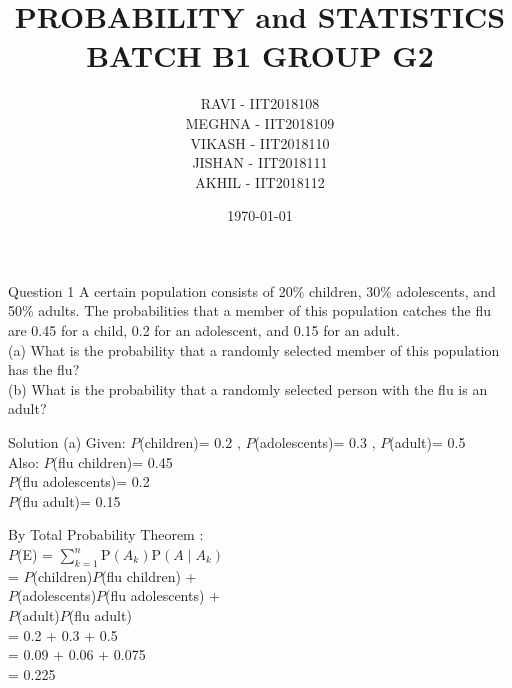 \documentclass{beamer}
\title{PROBABILITY and STATISTICS \\ BATCH B1 GROUP G2}
\author{RAVI - IIT2018108 \\ MEGHNA - IIT2018109 \\ VIKASH - IIT2018110 \\ JISHAN -  IIT2018111 \\ AKHIL - IIT2018112}
\institute{Indian Institute of Information Technology,Allahabad}
\date{\today}
\begin{document}
\begin{frame}
\titlepage
\end{frame}

\begin{frame}{Question 1}
\large {A certain population consists of 20\% children, 30\% adolescents, and 50\% adults. The probabilities that a member of this population catches the flu are 0.45 for a child, 0.2 for an adolescent, and 0.15 for an adult.\\
(a) What is the probability that a randomly selected member of this population has
the flu?\\
(b) What is the probability that a randomly selected person with the flu is an adult?}

\end{frame}
\begin{frame}{Solution}
(a) Given: $P$(children)= 0.2 , $P$(adolescents)= 0.3 , $P$(adult)= 0.5 \\
Also: $P$(flu \mid children)= 0.45 \\ \hspace{9mm} $P$(flu \mid adolescents)= 0.2 \\ \hspace{9mm} $P$(flu \mid adult)= 0.15 

\vspace{2mm}\hspace{10mm}
By Total Probability Theorem : \\
\vspace{2mm}\hspace{10mm} $P$(E) = $\sum_{k=1}^{n} $P$(A_k)$P$(A\mid A_k)$ \\
\vspace{2mm}\hspace{20mm}        = $P$(children)\times $P$(flu \mid children) +
\\ \vspace{2mm}\hspace{20mm} $P$(adolescents)\times $P$(flu \mid adolescents) +
\\ \vspace{2mm}\hspace{20mm} $P$(adult)\times $P$(flu \mid adult) \\
\vspace{2mm}\hspace{10mm} = 0.2 + 0.3 + 0.5\\
\vspace{2mm}\hspace{10mm} = 0.09 + 0.06 + 0.075 \\
\vspace{2mm}\hspace{10mm} = 0.225 \\
\end{frame}
\end{document}
